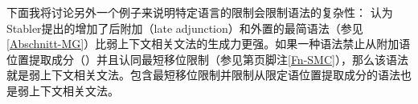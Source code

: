 下面我将讨论另外一个例子来说明特定语言的限制会限制语法的复杂性： \citet[\S~3.2]{GM2007a}认为Stabler提出的增加了后附加（late adjunction）和外置的最简语法\indexmg（参见\ref{Abschnitt-MG}）比弱上下文相关文法的生成力更强。如果一种语法禁止从附加语位置提取成分（\citealp[]{FG2002a}）并且认同最短移位限制（参见第\pageref{Fn-SMC}页脚注\ref{Fn-SMC}），那么该语法就是弱上下文相关文法\citep[]{GM2007a}。包含最短移位限制并限制从限定语位置提取成分的语法也是弱上下文相关文法。

